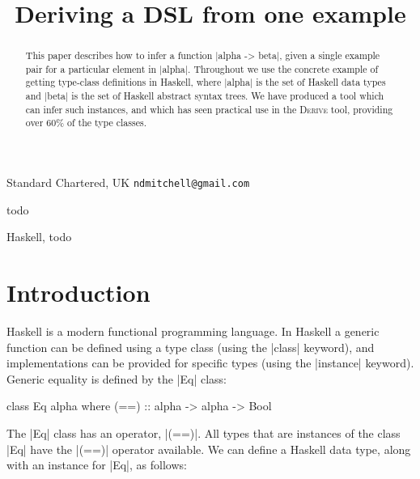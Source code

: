 \documentclass[preprint]{sigplanconf}
\newcommand{\derive}{\textsc{Derive}}
\begin{document}
\copyrightdata{[to be supplied]}

\titlebanner{\today{} - \currenttime{}}        %
\preprintfooter{}   %

\title{Deriving a DSL from one example}

           {Standard Chartered, UK}
           {\verb"ndmitchell@gmail.com"}

\maketitle

\begin{abstract}
This paper describes how to infer a function |alpha -> beta|, given a single example pair for a particular element in |alpha|. Throughout we use the concrete example of getting type-class definitions in Haskell, where |alpha| is the set of Haskell data types and |beta| is the set of Haskell abstract syntax trees. We have produced a tool which can infer such instances, and which has seen practical use in the {\derive} tool, providing over 60\% of the type classes.
\end{abstract}


\terms
todo

\keywords
Haskell, todo

\section{Introduction}

Haskell \cite{haskell} is a modern functional programming language. In Haskell a generic function can be defined using a type class \cite{wadler:type_classes} (using the |class| keyword), and implementations can be provided for specific types (using the |instance| keyword). Generic equality is defined by the |Eq| class:

\begin{code}
class Eq alpha where
    (==) :: alpha -> alpha -> Bool
\end{code}

The |Eq| class has an operator, |(==)|. All types that are instances of the class |Eq| have the |(==)| operator available. We can define a Haskell data type, along with an instance for |Eq|, as follows:
\end{document}
